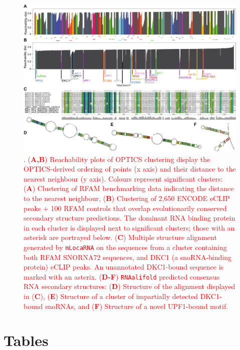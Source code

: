 \documentclass{bmcart}
\begin{document}
\begin{backmatter}
\begin{figure}[h!]
 \includegraphics[width=\textwidth]{fig5}
 \caption {. 
 \textcolor{red} {
 (\textbf{A,B}) Reachability plots of OPTICS clustering display the OPTICS-derived ordering of points (x axis) and their distance to the nearest neighbour (y axis). Colours represent significant clusters: (\textbf{A}) Clustering of RFAM benchmarking data indicating the distance to the nearest neighbour,
 (\textbf{B}) Clustering of 2,650 ENCODE eCLIP peaks + 100 RFAM controls that overlap evolutionarily conserved secondary structure predictions. The dominant RNA binding protein in each cluster is displayed next to significant clusters; those with an asterisk are portrayed below.
 (\textbf{C}) Multiple structure alignment generated by \texttt{mLocaRNA} on the sequences from a 
 cluster containing both RFAM SNORNA72 sequences, and DKC1 (a snoRNA-binding protein) eCLIP peaks. 
An unannotated DKC1-bound sequence is marked with an asterix.
 (\textbf{D-F}) \texttt{RNAalifold} predicted consensus RNA secondary structures: 
 (\textbf{D}) Structure of the alignment displayed in (\textbf{C}), 
 (\textbf{E}) Structure of a cluster of impartially detected DKC1-bound snoRNAs, and
 (\textbf{F}) Structure of a novel UPF1-bound motif. }}
\end{figure}



\section*{Tables}


\end{backmatter}
\end{document}

